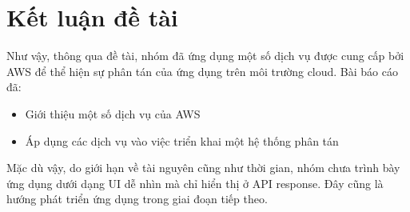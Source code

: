 \section{Kết luận đề tài}
\label{conclution}

Như vậy, thông qua đề tài, nhóm đã ứng dụng một số dịch vụ được cung cấp bởi AWS để thể hiện sự phân tán của ứng dụng trên môi trường cloud. Bài báo cáo đã:

\begin{itemize}
    \item Giới thiệu một số dịch vụ của AWS
    \item Áp dụng các dịch vụ vào việc triển khai một hệ thống phân tán
        
\end{itemize}

Mặc dù vậy, do giới hạn về tài nguyên cũng như thời gian, nhóm chưa trình bày ứng dụng dưới dạng UI dễ nhìn mà chỉ hiển thị ở API response. Đây cũng là hướng phát triển ứng dụng trong giai đoạn tiếp theo.